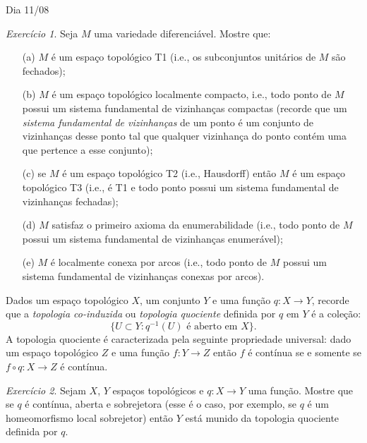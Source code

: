 \documentclass[oneside,11pt]{amsart}
\theoremstyle{remark}\newtheorem{exercise}{Exercício}[section]
\theoremstyle{plain}\newtheorem{teo}{Teorema}[section]
\theoremstyle{plain}\newtheorem{lem}[teo]{Lema}
\theoremstyle{plain}\newtheorem{prop}[teo]{Proposição}
\theoremstyle{definition}\newtheorem{defin}[teo]{Definição}
\theoremstyle{remark}\newtheorem{rem}[teo]{Observação}
\theoremstyle{definition}\newtheorem{example}[teo]{Exemplo}
\numberwithin{equation}{section}
\begin{document}
\begin{section}{Dia 11/08}
\begin{exercise}\label{exe:manifoldtop}
Seja $M$ uma variedade diferenciável. Mostre que:
\begin{itemize}
\item[(a)] $M$ é um espaço topológico T1 (i.e., os subconjuntos unitários de $M$ são fechados);
\item[(b)] $M$ é um espaço topológico localmente compacto, i.e., todo ponto de $M$ possui um sistema fundamental
de vizinhanças compactas (recorde que um {\em sistema fundamental de vizinhanças\/} de um ponto é um conjunto de vizinhanças
desse ponto tal que qualquer vizinhança do ponto contém uma que pertence a esse conjunto);
\item[(c)] se $M$ é um espaço topológico T2 (i.e., Hausdorff) então $M$ é um espaço topológico T3 (i.e., é T1 e todo ponto
possui um sistema fundamental de vizinhanças fechadas);
\item[(d)] $M$ satisfaz o primeiro axioma da enumerabilidade (i.e., todo ponto de $M$ possui um sistema fundamental
de vizinhanças enumerável);
\item[(e)] $M$ é localmente conexa por arcos (i.e., todo ponto de $M$ possui um sistema fundamental de vizinhanças
conexas por arcos).
\end{itemize}
\end{exercise}

Dados um espaço topológico $X$, um conjunto $Y$ e uma função $q:X\to Y$, recorde que a {\em topologia co-induzida\/}
ou {\em topologia quociente\/} definida por $q$ em $Y$ é a coleção:
\[\big\{U\subset Y:\text{$q^{-1}(U)$ é aberto em $X$}\big\}.\]
A topologia quociente é caracterizada pela seguinte propriedade universal: dado um espaço topológico $Z$ e uma função $f:Y\to Z$ então
$f$ é contínua se e somente se $f\circ q:X\to Z$ é contínua.
\begin{exercise}\label{exe:contopensur}
Sejam $X$, $Y$ espaços topológicos e $q:X\to Y$ uma função. Mostre que se $q$ é contínua, aberta e sobrejetora (esse é o caso,
por exemplo, se $q$ é um homeomorfismo local sobrejetor) então $Y$ está munido da topologia
quociente definida por $q$.
\end{exercise}


\end{section}
\end{document}
